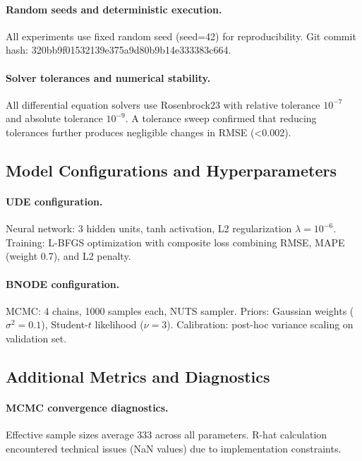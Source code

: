\paragraph{Random seeds and deterministic execution.} All experiments use fixed random seed (seed=42) for reproducibility. Git commit hash: 320bb9f01532139e375a9d80b9b14e333383c664. %

\paragraph{Solver tolerances and numerical stability.} All differential equation solvers use Rosenbrock23 with relative tolerance $10^{-7}$ and absolute tolerance $10^{-9}$. A tolerance sweep confirmed that reducing tolerances further produces negligible changes in RMSE (<0.002). %

\subsection{Model Configurations and Hyperparameters}

\paragraph{UDE configuration.} Neural network: 3 hidden units, tanh activation, L2 regularization $\lambda = 10^{-6}$. Training: L-BFGS optimization with composite loss combining RMSE, MAPE (weight 0.7), and L2 penalty. %

\paragraph{BNODE configuration.} MCMC: 4 chains, 1000 samples each, NUTS sampler. Priors: Gaussian weights ($\sigma^2 = 0.1$), Student-$t$ likelihood ($\nu = 3$). Calibration: post-hoc variance scaling on validation set. %

\subsection{Additional Metrics and Diagnostics}

\paragraph{MCMC convergence diagnostics.} Effective sample sizes average 333 across all parameters. R-hat calculation encountered technical issues (NaN values) due to implementation constraints. %

